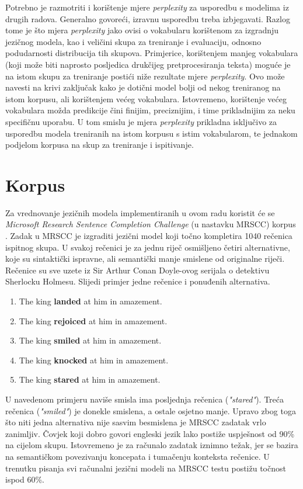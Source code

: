 \documentclass[times, utf8, diplomski, numeric]{fer}
\begin{document}
Potrebno je razmotriti i korištenje mjere \textit{perplexity} za usporedbu s modelima iz drugih radova. Generalno govoreći, izravnu usporedbu treba izbjegavati. Razlog tome je što mjera \textit{perplexity} jako ovisi o vokabularu korištenom za izgradnju jezičnog modela, kao i veličini skupa za treniranje i evaluaciju, odnosno podudarnosti distribucija tih skupova. Primjerice, korištenjem manjeg vokabulara (koji može biti naprosto posljedica drukčijeg pretprocesiranja teksta) moguće je na istom skupu za treniranje postići niže rezultate mjere \textit{perplexity}. Ovo može navesti na krivi zaključak kako je dotični model bolji od nekog treniranog na istom korpusu, ali korištenjem većeg vokabulara. Istovremeno, korištenje većeg vokabulara možda predikcije čini finijim, preciznijim, i time prikladnijim za neku specifičnu uporabu. U tom smislu je mjera \textit{perplexity} prikladna isključivo za usporedbu modela treniranih na istom korpusu s istim vokabularom, te jednakom podjelom korpusa na skup za treniranje i ispitivanje.

\section{Korpus}

Za vrednovanje jezičnih modela implementiranih u ovom radu koristit će se \textit{Microsoft Research Sentence Completion Challenge} (u nastavku MRSCC) korpus \cite{mrscc}. Zadak u MRSCC je izgraditi jezični model koji točno kompletira 1040 rečenica ispitnog skupa. U svakoj rečenici je za jednu riječ osmišljeno četiri alternativne, koje su sintaktički ispravne, ali semantički manje smislene od originalne riječi. Rečenice su sve uzete iz Sir Arthur Conan Doyle-ovog serijala o detektivu Sherlocku Holmesu. Slijedi primjer jedne rečenice i ponuđenih alternativa.

\begin{enumerate} 
\item{The king \textbf{landed} at him in amazement.}
\item{The king \textbf{rejoiced} at him in amazement.}
\item{The king \textbf{smiled} at him in amazement.}
\item{The king \textbf{knocked} at him in amazement.}
\item{The king \textbf{stared} at him in amazement.}
\end{enumerate}

U navedenom primjeru naviše smisla ima posljednja rečenica (\textit{"stared"}). Treća rečenica (\textit{"smiled"}) je donekle smislena, a ostale osjetno manje. Upravo zbog toga što niti jedna alternativa nije sasvim besmislena je MRSCC zadatak vrlo zanimljiv. Čovjek koji dobro govori engleski jezik lako postiže uspješnost od 90\% na cijelom skupu. Istovremeno je za računalo zadatak iznimno težak, jer se bazira na semantičkom povezivanju koncepata i tumačenju konteksta rečenice. U trenutku pisanja svi računalni jezični modeli na MRSCC testu postižu točnost ispod 60\%.
\end{document}
